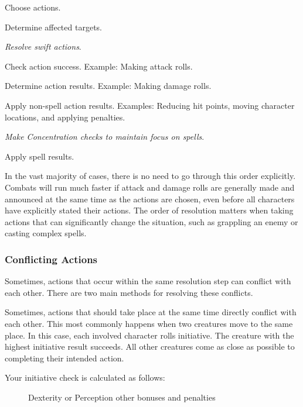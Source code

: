 \begin{enumerate*}
    \item Choose actions.
    \item Determine affected targets.
    \item \textit{Resolve swift actions}.
    \item Check action success.
        Example: Making attack rolls.
    \item Determine action results.
        Example: Making damage rolls.
    \item Apply non-spell action results.
        Examples: Reducing hit points, moving character locations, and applying penalties.
    \item \textit{Make Concentration checks to maintain focus on spells}.
    \item Apply spell results.
\end{enumerate*}

In the vast majority of cases, there is no need to go through this order explicitly.
Combats will run much faster if attack and damage rolls are generally made and announced at the same time as the actions are chosen, even before all characters have explicitly stated their actions.
The order of resolution matters when taking actions that can significantly change the situation, such as grappling an enemy or casting complex spells.

\subsubsection{Conflicting Actions}\label{Conflicting Actions}

Sometimes, actions that occur within the same resolution step can conflict with each other.
There are two main methods for resolving these conflicts.

 Sometimes, actions that should take place at the same time directly conflict with each other.
This most commonly happens when two creatures move to the same place.
In this case, each involved character rolls initiative.
The creature with the highest initiative result succeeds.
All other creatures come as close as possible to completing their intended action.

Your initiative check is calculated as follows:

\begin{figure}[h]
    \centering Dexterity or Perception  \add other bonuses and penalties
\end{figure}

